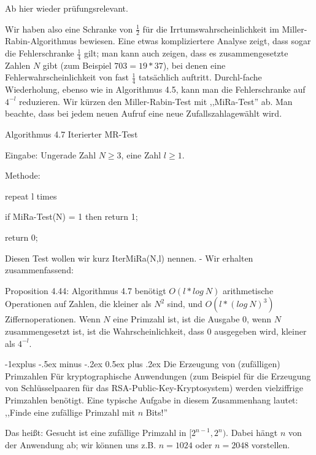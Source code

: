 \documentclass[a4paper]{article}
\makeatletter
\renewcommand{\subsection}{\@startsection{subsection}{2}{0mm}%
 {-1explus -.5ex minus -.2ex}%
 {0.5ex plus .2ex}%
 {\normalfont\normalsize\bfseries}}
\makeatother
\begin{document}
\begin{multicols}{3}
        Ab hier wieder prüfungsrelevant.

        Wir haben also eine Schranke von $\frac{1}{2}$ für die Irrtumswahrscheinlichkeit im Miller-Rabin-Algorithmus bewiesen. Eine etwas kompliziertere Analyse zeigt, dass sogar die Fehlerschranke $\frac{1}{4}$ gilt; man kann auch zeigen, dass es zusammengesetzte Zahlen $N$ gibt (zum Beispiel $703 = 19*37$), bei denen eine Fehlerwahrscheinlichkeit von fast $\frac{1}{4}$ tatsächlich auftritt. Durchl-fache Wiederholung, ebenso wie in Algorithmus 4.5, kann man die Fehlerschranke auf $4^{-l}$ reduzieren. Wir kürzen den Miller-Rabin-Test mit ,,MiRa-Test'' ab. Man beachte, dass bei jedem neuen Aufruf eine neue Zufallszahlagewählt wird.

        Algorithmus 4.7 Iterierter MR-Test
        \begin{itemize*}
            \item Eingabe: Ungerade Zahl $N\geq 3$, eine Zahl $l\geq 1$.
            \item Methode:
            \item repeat l times
            \item if MiRa-Test(N) = 1 then return 1;
            \item return 0;
        \end{itemize*}

        Diesen Test wollen wir kurz IterMiRa(N,l) nennen. - Wir erhalten zusammenfassend:

        Proposition 4.44: Algorithmus 4.7 benötigt $O(l*log\ N)$ arithmetische Operationen auf Zahlen, die kleiner als $N^2$ sind, und $O(l*(log\ N)^3)$ Ziffernoperationen. Wenn $N$ eine Primzahl ist, ist die Ausgabe $0$, wenn $N$ zusammengesetzt ist, ist die Wahrscheinlichkeit, dass $0$ ausgegeben wird, kleiner als $4^{-l}$.

        \subsection{Die Erzeugung von (zufälligen) Primzahlen}
        Für kryptographische Anwendungen (zum Beispiel für die Erzeugung von Schlüsselpaaren für das RSA-Public-Key-Kryptosystem) werden vielziffrige Primzahlen benötigt. Eine typische Aufgabe in diesem Zusammenhang lautet: ,,Finde eine zufällige Primzahl mit $n$ Bits!''

        Das heißt: Gesucht ist eine zufällige Primzahl in $[2^{n-1}, 2^n)$. Dabei hängt $n$ von der Anwendung ab; wir können uns z.B. $n=1024$ oder $n=2048$ vorstellen.


\end{multicols}
\end{document}
